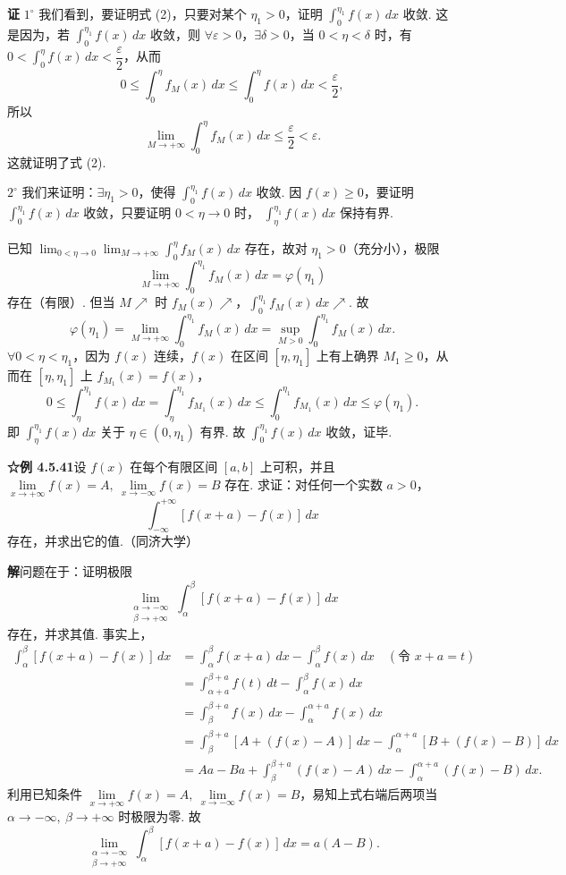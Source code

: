 \documentclass[UTF8,12pt,a4paper,fontset=fandol]{ctexart}
\begin{document}
\noindent\textbf{证}\quad
$1^\circ$ 我们看到，要证明式 (2)，只要对某个 $\eta_1>0$，证明 $\displaystyle\int_0^{\eta_1}f(x)\,dx$ 收敛.
这是因为，若 $\displaystyle\int_0^{\eta_1}f(x)\,dx$ 收敛，则 $\forall\varepsilon>0$，$\exists\delta>0$，当 $0<\eta<\delta$ 时，有
$0<\displaystyle\int_0^\eta f(x)\,dx<\dfrac\varepsilon2$，从而
\[
0\le\int_0^\eta f_M(x)\,dx\le\int_0^\eta f(x)\,dx<\frac\varepsilon2,
\]
所以
\[
\lim_{M\to+\infty}\int_0^\eta f_M(x)\,dx\le\frac\varepsilon2<\varepsilon.
\]
这就证明了式 (2).

$2^\circ$ 我们来证明：$\exists\eta_1>0$，使得 $\displaystyle\int_0^{\eta_1}f(x)\,dx$ 收敛.
因 $f(x)\ge0$，要证明 $\displaystyle\int_0^{\eta_1}f(x)\,dx$ 收敛，只要证明 $0<\eta\to0$ 时，
$\displaystyle\int_\eta^{\eta_1}f(x)\,dx$ 保持有界.

已知 $\displaystyle\lim_{0<\eta\to0}\lim_{M\to+\infty}\int_0^\eta f_M(x)\,dx$ 存在，故对 $\eta_1>0$（充分小），极限
\[
\lim_{M\to+\infty}\int_0^{\eta_1}f_M(x)\,dx=\varphi(\eta_1)
\]
存在（有限）. 但当 $M\nearrow$ 时 $f_M(x)\nearrow$，$\displaystyle\int_0^{\eta_1}f_M(x)\,dx\nearrow$. 故
\begin{equation}
\varphi(\eta_1)=\lim_{M\to+\infty}\int_0^{\eta_1}f_M(x)\,dx
=\sup_{M>0}\int_0^{\eta_1}f_M(x)\,dx. \tag{3}
\end{equation}
$\forall 0<\eta<\eta_1$，因为 $f(x)$ 连续，$f(x)$ 在区间 $[\eta,\eta_1]$ 上有上确界 $M_1\ge0$，从而在 $[\eta,\eta_1]$ 上
$f_{M_1}(x)=f(x)$，
\[
0\le\int_\eta^{\eta_1}f(x)\,dx
=\int_\eta^{\eta_1}f_{M_1}(x)\,dx
\le\int_0^{\eta_1}f_{M_1}(x)\,dx
\le\varphi(\eta_1).
\]
即 $\displaystyle\int_\eta^{\eta_1}f(x)\,dx$ 关于 $\eta\in(0,\eta_1)$ 有界. 故
$\displaystyle\int_0^{\eta_1}f(x)\,dx$ 收敛，证毕.

\noindent\textbf{☆例 4.5.41}\quad 设 $f(x)$ 在每个有限区间 $[a,b]$ 上可积，并且
$\lim\limits_{x\to+\infty}f(x)=A,\ \lim\limits_{x\to-\infty}f(x)=B$ 存在. 求证：对任何一个实数 $a>0$，
\[
\int_{-\infty}^{+\infty}[f(x+a)-f(x)]\,dx
\]
存在，并求出它的值.（同济大学）

\noindent\textbf{解}\quad 问题在于：证明极限
\[
\lim_{\substack{\alpha\to-\infty\\ \beta\to+\infty}}
\int_\alpha^\beta[f(x+a)-f(x)]\,dx
\]
存在，并求其值. 事实上，
\[
\begin{aligned}
\int_\alpha^\beta[f(x+a)-f(x)]\,dx
&=\int_\alpha^\beta f(x+a)\,dx-\int_\alpha^\beta f(x)\,dx\quad(\text{令 }x+a=t)\\
&=\int_{\alpha+a}^{\beta+a}f(t)\,dt-\int_\alpha^\beta f(x)\,dx\\
&=\int_\beta^{\beta+a}f(x)\,dx-\int_\alpha^{\alpha+a}f(x)\,dx\\
&=\int_\beta^{\beta+a}[A+(f(x)-A)]\,dx-\int_\alpha^{\alpha+a}[B+(f(x)-B)]\,dx\\
&=Aa-Ba+\int_\beta^{\beta+a}(f(x)-A)\,dx-\int_\alpha^{\alpha+a}(f(x)-B)\,dx.
\end{aligned}
\]
利用已知条件 $\lim\limits_{x\to+\infty}f(x)=A,\ \lim\limits_{x\to-\infty}f(x)=B$，易知上式右端后两项当
$\alpha\to-\infty,\ \beta\to+\infty$ 时极限为零. 故
\[
\lim_{\substack{\alpha\to-\infty\\ \beta\to+\infty}}
\int_\alpha^\beta[f(x+a)-f(x)]\,dx=a(A-B).
\]
\end{document}
